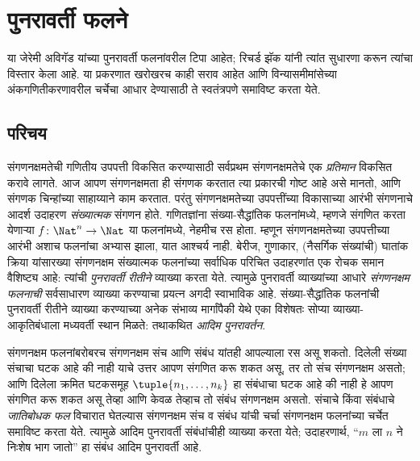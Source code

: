 \chapter{पुनरावर्ती फलने}\label{cmp:rec::chap}
\begin{editorial}
  या जेरेमी अविगॅड यांच्या पुनरावर्ती फलनांवरील टिपा आहेत; रिचर्ड झॅक
  यांनी त्यांत सुधारणा करून त्यांचा विस्तार केला आहे. या प्रकरणात
  खरोखरच काही सराव आहेत आणि विन्यासमीमांसेच्या अंकगणितीकरणावरील
  चर्चेचा आधार देण्यासाठी ते स्वतंत्रपणे समाविष्ट करता येते.
\end{editorial}








\section{परिचय}\label{cmp:rec:int:sec}

संगणनक्षमतेची गणितीय उपपत्ती विकसित करण्यासाठी सर्वप्रथम
संगणनक्षमतेचे एक \emph{प्रतिमान} विकसित करावे लागते. आज आपण
संगणनक्षमता ही संगणक करतात त्या प्रकारची गोष्ट आहे असे मानतो, आणि संगणक
चिन्हांच्या साहाय्याने काम करतात. परंतु संगणनक्षमतेच्या उपपत्तींच्या
विकासाच्या आरंभी संगणनाचे आदर्श उदाहरण \emph{संख्यात्मक} संगणन होते.
गणितज्ञांना संख्या-सैद्धांतिक फलनांमध्ये, म्हणजे संगणित करता येणाऱ्या
$f\colon \Nat^n \to \Nat$ या फलनांमध्ये, नेहमीच रस होता. म्हणून
संगणनक्षमतेच्या उपपत्तीच्या आरंभी अशाच फलनांचा अभ्यास झाला, यात आश्चर्य
नाही. बेरीज, गुणाकार, (नैसर्गिक संख्यांची) घातांक क्रिया यांसारख्या
संगणनक्षम संख्यात्मक फलनांच्या सर्वाधिक परिचित उदाहरणांत एक रोचक समान
वैशिष्ट्य आहे: त्यांची \emph{पुनरावर्ती रीतीने} व्याख्या करता येते.
त्यामुळे पुनरावर्ती व्याख्यांच्या आधारे \emph{संगणनक्षम फलनाची}
सर्वसाधारण व्याख्या करण्याचा प्रयत्न अगदी स्वाभाविक आहे.
संख्या-सैद्धांतिक फलनांची पुनरावर्ती रीतीने व्याख्या करण्याच्या अनेक
संभाव्य मार्गांपैकी येथे एका विशेषतः सोप्या व्याख्या-आकृतिबंधाला
मध्यवर्ती स्थान मिळते: तथाकथित \emph{आदिम पुनरावर्तन}.

संगणनक्षम फलनांबरोबरच संगणनक्षम संच आणि संबंध यांतही आपल्याला रस असू
शकतो. दिलेली संख्या संचाचा घटक आहे की नाही याचे उत्तर आपण
संगणित करू शकत असू, तर तो संच संगणनक्षम असतो; आणि दिलेला क्रमित
घटकसमूह $\tuple{n_1, \dots, n_k}$ हा संबंधाचा घटक आहे
की नाही हे आपण संगणित करू शकत असू तेव्हा आणि केवळ तेव्हाच तो संबंध
संगणनक्षम असतो. संचाचे किंवा संबंधाचे \emph{जातिबोधक फल} विचारात
घेतल्यास संगणनक्षम संच व संबंध यांची चर्चा संगणनक्षम फलनांच्या चर्चेत
समाविष्ट करता येते. त्यामुळे आदिम पुनरावर्ती संबंधांचीही व्याख्या करता
येते; उदाहरणार्थ, ``$m$ ला $n$ ने निःशेष भाग जातो'' हा संबंध आदिम
पुनरावर्ती आहे.

